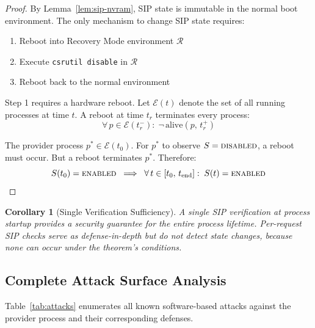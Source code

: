 \documentclass[10pt,twocolumn,letterpaper]{article}
\newtheorem{corollary}{Corollary}
\begin{document}
\begin{proof}
By Lemma~\ref{lem:sip-nvram}, SIP state is immutable in the normal boot environment. The only mechanism to change SIP state requires:
\begin{enumerate}[leftmargin=*,itemsep=1pt]
    \item Reboot into Recovery Mode environment $\mathcal{R}$
    \item Execute \texttt{csrutil disable} in $\mathcal{R}$
    \item Reboot back to the normal environment
\end{enumerate}

Step 1 requires a hardware reboot. Let $\mathcal{E}(t)$ denote the set of all running processes at time $t$. A reboot at time $t_r$ terminates every process:
\begin{equation}
    \forall\, p \in \mathcal{E}(t_r^-):\; \lnot\,\text{alive}(p,\, t_r^+)
\end{equation}

The provider process $p^* \in \mathcal{E}(t_0)$. For $p^*$ to observe $S = \textsc{disabled}$, a reboot must occur. But a reboot terminates $p^*$. Therefore:
\begin{equation}
    S(t_0) = \textsc{enabled} \;\implies\; \forall\, t \in [t_0,\, t_{\text{end}}]:\; S(t) = \textsc{enabled}
\end{equation}
\end{proof}

\begin{corollary}[Single Verification Sufficiency]
\label{cor:single-check}
A single SIP verification at process startup provides a security guarantee for the entire process lifetime. Per-request SIP checks serve as defense-in-depth but do not detect state changes, because none can occur under the theorem's conditions.
\end{corollary}

\subsection{Complete Attack Surface Analysis}

Table~\ref{tab:attacks} enumerates all known software-based attacks against the provider process and their corresponding defenses.
\end{document}

